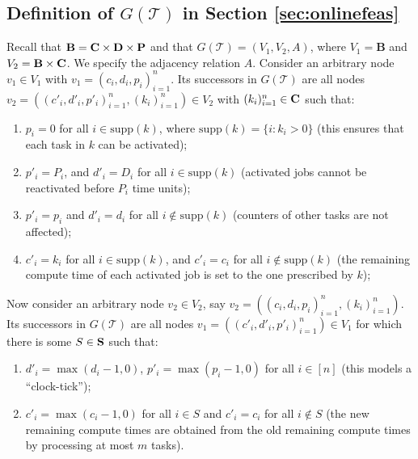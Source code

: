 \documentclass{llncs}
\newcommand{\tsys}{\ensuremath{\mathcal{T}}}
\newcommand{\backlog}{\ensuremath{\mathbf{B}}}
\newcommand{\supp}{\ensuremath{\mathrm{supp}}}
\begin{document}
\subsection{Definition of $G(\tsys)$ in Section \ref{sec:onlinefeas}}
Recall that $\backlog = \rct \times \ttd \times \tta$ and that $G(\tsys)=(V_1,V_2,A)$, where $V_1 = \backlog$ and $V_2 = \backlog \times \rct$. 
We specify the adjacency relation $A$. Consider an arbitrary node $v_1 \in V_1$ with $v_1=(c_i,d_i,p_i)_{i=1}^n$. Its successors in $G(\tsys)$ are all nodes $v_2=((c'_i,d'_i,p'_i)_{i=1}^n,(k_i)_{i=1}^n) \in V_2$ with $(k_i)_{i=1}^n \in \mathbf{C}$ such that: 
\begin{enumerate}
\item $p_i = 0$ for all $i \in \supp(k)$, where $\supp(k)=\{i : k_i > 0\}$ (this ensures that each task in $k$ can be activated); 
\item $p'_i = P_i$, and $d'_i = D_i$ for all $i \in \supp(k)$ (activated jobs cannot be reactivated before $P_i$ time units); 
\item $p'_i = p_i$ and $d'_i = d_i$ for all $i \notin \supp(k)$ (counters of other tasks are not affected); 
\item $c'_i = k_i$ for all $i \in \supp(k)$, and $c'_i = c_i$ for all $i \notin \supp(k)$ (the remaining compute time of each activated job is set to the one prescribed by $k$);    
\end{enumerate}
Now consider an arbitrary node $v_2 \in V_2$, say $v_2 = ((c_i,d_i,p_i)_{i=1}^n, (k_i)_{i=1}^n)$. Its successors in $G(\tsys)$ are all nodes $v_1=((c'_i,d'_i,p'_i)_{i=1}^n) \in V_1$ for which there is some $S \in \mathbf{S}$ such that: 
\begin{enumerate}
\item $d'_i = \max(d_i-1,0)$, $p'_i = \max(p_i-1,0)$ for all $i \in [n]$ (this models a ``clock-tick''); 
\item $c'_i = \max(c_i-1,0)$ for all $i \in S$ and $c'_i = c_i$ for all $i \notin S$ (the new remaining compute times are obtained from the old remaining compute times by processing at most $m$ tasks). 
\end{enumerate}
\end{document}
